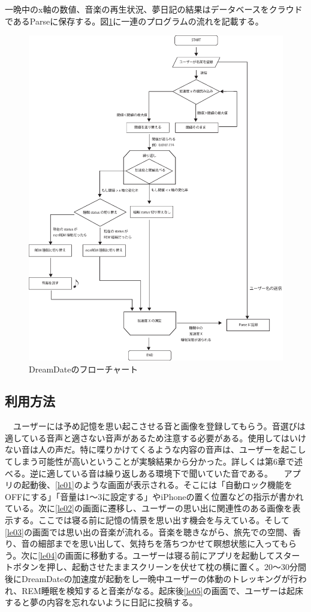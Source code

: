 一晩中のx軸の数値、音楽の再生状況、夢日記の結果はデータベースをクラウドであるParseに保存する。図\ref{system}に一連のプログラムの流れを記載する。
\begin{figure}[htbp]
\begin{center}
\includegraphics[width=15cm]{eps/system.eps}
\caption{DreamDateのフローチャート}
\label{system}
\end{center}
\end{figure}

\subsection{利用方法}
　ユーザーには予め記憶を思い起こさせる音と画像を登録してもらう。音選びは適している音声と適さない音声があるため注意する必要がある。使用してはいけない音は人の声だ。特に喋りかけてくるような内容の音声は、ユーザーを起こしてしまう可能性が高いということが実験結果から分かった。詳しくは第6章で述べる。逆に適している音は繰り返しある環境下で聞いていた音である。
　アプリの起動後、\ref{le01}のような画面が表示される。そこには「自動ロック機能をOFFにする」「音量は1〜3に設定する」やiPhoneの置く位置などの指示が書かれている。次に\ref{le02}の画面に遷移し、ユーザーの思い出に関連性のある画像を表示する。ここでは寝る前に記憶の情景を思い出す機会を与えている。そして\ref{le03}の画面では思い出の音楽が流れる。音楽を聴きながら、旅先での空間、香り、音の細部までを思い出して、気持ちを落ちつかせて瞑想状態に入ってもらう。次に\ref{le04}の画面に移動する。ユーザーは寝る前にアプリを起動してスタートボタンを押し、起動させたままスクリーンを伏せて枕の横に置く。20〜30分間後にDreamDateの加速度が起動をし一晩中ユーザーの体動のトレッキングが行われ、REM睡眠を検知すると音楽がなる。起床後\ref{le05}の画面で、ユーザーは起床すると夢の内容を忘れないように日記に投稿する。

